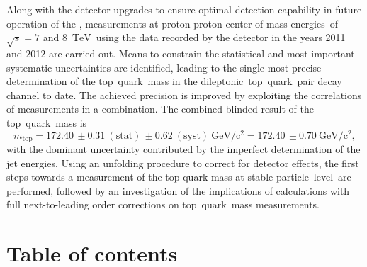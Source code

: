 \documentclass[a4paper,11pt,twoside,openright,notitlepage]{report}
\newcommand{\CombValue                 }{\ensuremath{172.40}\xspace}%
\newcommand{\CombStat                  }{\ensuremath{0.31}\xspace}
\newcommand{\CombSyst                  }{\ensuremath{0.62}\xspace}
\newcommand{\CombTot                   }{\ensuremath{0.70}\xspace}
\newcommand{\XZ           }[3]{\ensuremath{#1\,\pm #2~\mathrm{(stat)}\,\pm #3~\mathrm{(syst)}}\xspace}
\newcommand{\XZtot        }[2]{\ensuremath{#1\,\pm #2}\xspace}
\newcommand{\dileptonic   }{\ensuremath{\mbox{dileptonic}}\xspace}
\newcommand{\mt           }{\ensuremath{m_{\mathrm{top}}}\xspace}
\newcommand{\GeV            }{\ensuremath{\mathrm{GeV}\xspace}}
\newcommand{\TeV            }{\ensuremath{\mathrm{TeV}\xspace}}
\newcommand{\cmes           }{center-of-mass energies\xspace}
\newcommand{\sqrts        }{\ensuremath{{\sqrt{s}}}\xspace}
\newcommand\tquark{top~quark\xspace}
\newcommand{\stabl        }{stable particle\xspace}
\newcommand{\stablevel    }{\stabl\ level\xspace}
\begin{document}
Along with the detector upgrades to ensure optimal detection capability in future operation of the , measurements at proton-proton \cmes\ of $\sqrts=7$ and $8$~\TeV\ using the data recorded by the  detector in the years 2011 and 2012 are carried out. Means to constrain the statistical and most important systematic uncertainties are identified, leading to the single most precise determination of the \tquark\ mass in the \dileptonic\ \tquark\ pair decay channel to date. The achieved precision is improved by exploiting the correlations of  measurements in a combination. The combined blinded result of the \tquark\ mass is
\[
\mt = \XZ{\CombValue}{\CombStat}{\CombSyst}~\GeV/\mathrm{c}^2 = \XZtot{\CombValue}{\CombTot}~\GeV/\mathrm{c}^2,
\]
with the dominant uncertainty contributed by the imperfect determination of the jet energies. Using an unfolding procedure to correct for detector effects, the first steps towards a measurement of the top quark mass at \stablevel\ are performed, followed by an investigation of the implications of calculations with full next-to-leading order  corrections on \tquark\ mass measurements.


\cleardoublepage


\pagestyle{fancy}

\chapter*{Table of contents}
\renewcommand{\contentsname}{}
\tableofcontents
\cleardoublepage













\end{document}
